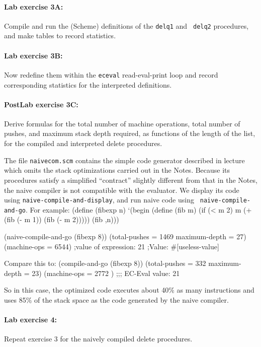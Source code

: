 \paragraph{Lab exercise 3A:}
Compile and run the (Scheme) definitions of the {\tt delq1} and {\tt
delq2} procedures, and make tables to record statistics.

\paragraph{Lab exercise 3B:}
Now redefine them within the {\tt eceval} read-eval-print loop and record
corresponding statistics for the interpreted definitions.

\paragraph{PostLab exercise 3C:}
Derive formulas for the total number of machine operations, total number
of pushes, and maximum stack depth required, as functions of the length of
the list, for the compiled and interpreted delete procedures.

\bigskip

The file {\tt naivecom.scm} contains the simple code generator
described in lecture which omits the stack optimizations carried out
in the Notes.  Because its procedures satisfy a simplified
``contract'' slightly different from that in the Notes, the naive
compiler is not compatible with the evaluator.  We display its code
using {\tt naive-compile-and-display}, and run naive code using {\tt
naive-compile-and-go}.  For example: \beginlisp (define (fibexp n)
  `(begin
     (define (fib m)
       (if (< m 2)
           m
           (+ (fib (- m 1)) (fib (- m 2)))))
     (fib ,n)))
\endlisp

\beginlisp
(naive-compile-and-go (fibexp 8))
(total-pushes = 1469 maximum-depth = 27)
(machine-ops = 6544)
;value of expression: 21
;Value: \#[useless-value]
\endlisp

Compare this to:
\beginlisp
(compile-and-go (fibexp 8))
(total-pushes = 332 maximum-depth = 23)
(machine-ops = 2772 )
;;; EC-Eval value: 21
\endlisp

So in this case, the optimized code executes about 40\% as many
instructions and uses 85\% of the stack space as the code generated by
the naive compiler.

\paragraph{Lab exercise 4:}  Repeat exercise 3 for the naively compiled
delete procedures.

